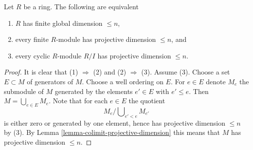 \begin{lemma}
\label{lemma-finite-gl-dim}
Let $R$ be a ring. The following are equivalent
\begin{enumerate}
\item $R$ has finite global dimension $\leq n$,
\item every finite $R$-module has projective dimension $\leq n$, and
\item every cyclic $R$-module $R/I$ has projective dimension $\leq n$.
\end{enumerate}
\end{lemma}

\begin{proof}
It is clear that (1) $\Rightarrow$ (2) and (2) $\Rightarrow$ (3).
Assume (3). Choose a set $E \subset M$ of generators of $M$.
Choose a well ordering on $E$. For $e \in E$ denote
$M_e$ the submodule of $M$ generated by the elements $e' \in E$
with $e' \leq e$. Then $M = \bigcup_{e \in E} M_e$.
Note that for each $e \in E$ the quotient
$$
M_e/\bigcup\nolimits_{e' < e} M_{e'}
$$
is either zero or generated by one element, hence has projective
dimension $\leq n$ by (3). By Lemma \ref{lemma-colimit-projective-dimension}
this means that $M$ has projective dimension $\leq n$.
\end{proof}
